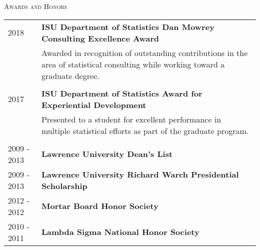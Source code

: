\documentclass[11pt, oneside]{article}
\begin{document}
\noindent \textsc{Awards and Honors} \hrulefill
\begin{longtable}{p{2.5cm}p{14cm}}
\hfill{2018} & \textbf{ISU Department of Statistics Dan Mowrey Consulting Excellence Award}\\
& Awarded in recognition of outstanding contributions in the area of statistical consulting while working toward a graduate degree.\\
\\
\hfill{2017} & \textbf{ISU Department of Statistics Award for Experiential Development}\\
& Presented to a student for excellent performance in multiple statistical efforts as part of the graduate program.\\
\\
\hfill{2009 - 2013} & \textbf{Lawrence University Dean’s List}\\
\hfill{2009 - 2013} & \textbf{Lawrence University Richard Warch Presidential Scholarship}\\
\hfill{2012 - 2012} & \textbf{Mortar Board Honor Society}\\
\hfill{2010 - 2011} & \textbf{Lambda Sigma National Honor Society}
\end{longtable}
\end{document}

